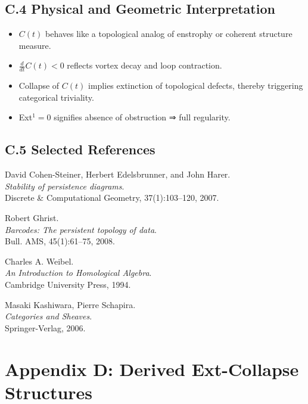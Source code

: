 \documentclass[11pt]{article}
\begin{document}
\subsection*{C.4 Physical and Geometric Interpretation}

\begin{itemize}
  \item $C(t)$ behaves like a topological analog of enstrophy or coherent structure measure.
  \item $\frac{d}{dt} C(t) < 0$ reflects vortex decay and loop contraction.
  \item Collapse of $C(t)$ implies extinction of topological defects, thereby triggering categorical triviality.
  \item Ext$^1 = 0$ signifies absence of obstruction ⇒ full regularity.
\end{itemize}

\subsection*{C.5 Selected References}

\begin{thebibliography}{9}

David Cohen-Steiner, Herbert Edelsbrunner, and John Harer.\\
\textit{Stability of persistence diagrams}.\\
Discrete \& Computational Geometry, 37(1):103--120, 2007.

Robert Ghrist.\\
\textit{Barcodes: The persistent topology of data}.\\
Bull. AMS, 45(1):61--75, 2008.

Charles A. Weibel.\\
\textit{An Introduction to Homological Algebra}.\\
Cambridge University Press, 1994.

Masaki Kashiwara, Pierre Schapira.\\
\textit{Categories and Sheaves}.\\
Springer-Verlag, 2006.

\end{thebibliography}



\section*{Appendix D: Derived Ext-Collapse Structures}
\end{document}
